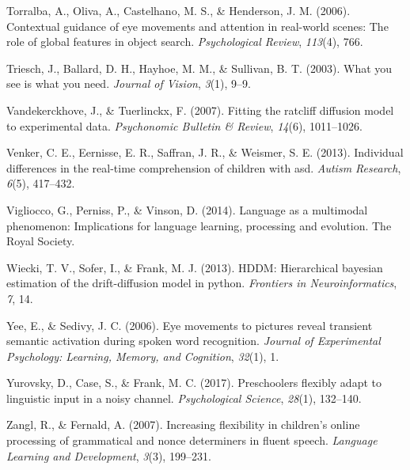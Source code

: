 \documentclass[,man,floatsintext]{apa6}
\begin{document}
\leavevmode\hypertarget{ref-torralba2006contextual}{}%
Torralba, A., Oliva, A., Castelhano, M. S., \& Henderson, J. M. (2006). Contextual guidance of eye movements and attention in real-world scenes: The role of global features in object search. \emph{Psychological Review}, \emph{113}(4), 766.

\leavevmode\hypertarget{ref-triesch2003you}{}%
Triesch, J., Ballard, D. H., Hayhoe, M. M., \& Sullivan, B. T. (2003). What you see is what you need. \emph{Journal of Vision}, \emph{3}(1), 9--9.

\leavevmode\hypertarget{ref-vandekerckhove2007fitting}{}%
Vandekerckhove, J., \& Tuerlinckx, F. (2007). Fitting the ratcliff diffusion model to experimental data. \emph{Psychonomic Bulletin \& Review}, \emph{14}(6), 1011--1026.

\leavevmode\hypertarget{ref-venker2013individual}{}%
Venker, C. E., Eernisse, E. R., Saffran, J. R., \& Weismer, S. E. (2013). Individual differences in the real-time comprehension of children with asd. \emph{Autism Research}, \emph{6}(5), 417--432.

\leavevmode\hypertarget{ref-vigliocco2014language}{}%
Vigliocco, G., Perniss, P., \& Vinson, D. (2014). Language as a multimodal phenomenon: Implications for language learning, processing and evolution. The Royal Society.

\leavevmode\hypertarget{ref-wiecki2013hddm}{}%
Wiecki, T. V., Sofer, I., \& Frank, M. J. (2013). HDDM: Hierarchical bayesian estimation of the drift-diffusion model in python. \emph{Frontiers in Neuroinformatics}, \emph{7}, 14.

\leavevmode\hypertarget{ref-yee2006eye}{}%
Yee, E., \& Sedivy, J. C. (2006). Eye movements to pictures reveal transient semantic activation during spoken word recognition. \emph{Journal of Experimental Psychology: Learning, Memory, and Cognition}, \emph{32}(1), 1.

\leavevmode\hypertarget{ref-yurovsky2017preschoolers}{}%
Yurovsky, D., Case, S., \& Frank, M. C. (2017). Preschoolers flexibly adapt to linguistic input in a noisy channel. \emph{Psychological Science}, \emph{28}(1), 132--140.

\leavevmode\hypertarget{ref-zangl2007increasing}{}%
Zangl, R., \& Fernald, A. (2007). Increasing flexibility in children's online processing of grammatical and nonce determiners in fluent speech. \emph{Language Learning and Development}, \emph{3}(3), 199--231.

\clearpage
\makeatletter
\efloat@restorefloats
\makeatother
\end{document}
